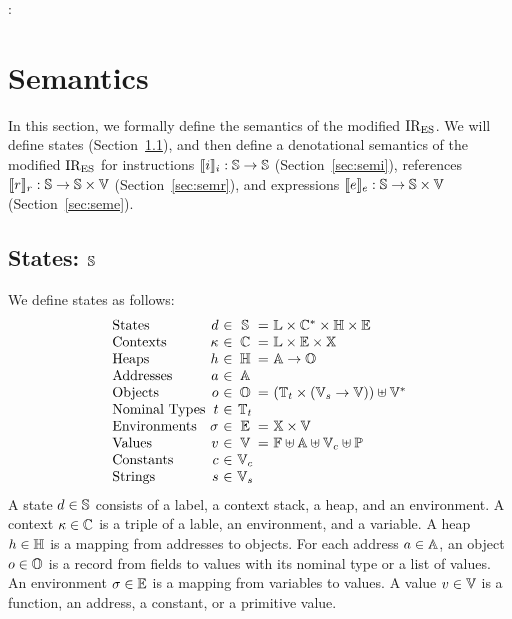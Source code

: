 : \section{Semantics}\label{sec:semantics}
In this section, we formally define the semantics of the modified ${\text{IR}_\text{ES}}$.  We
will define states (Section~\ref{sec:state}), and then define a denotational
semantics of the modified ${\text{IR}_\text{ES}}$ for instructions $\llbracket{i}\rrbracket_i: \mathbb{S}
\rightarrow \mathbb{S}$ (Section~\ref{sec:semi}), references $\llbracket{r}\rrbracket_r: \mathbb{S}
\rightarrow \mathbb{S} \times \mathbb{V}$ (Section~\ref{sec:semr}), and expressions
$\llbracket{e}\rrbracket_e: \mathbb{S} \rightarrow \mathbb{S} \times \mathbb{V}$ (Section~\ref{sec:seme}).


\subsection{States: $\mathbb{S}$}\label{sec:state}
We define states as follows:
\[
  \vspace*{-1em}
  \begin{array}{l@{~}r@{~}c@{~}c@{~}r@{~}l}
    \text{States}
    &\elem&\in&\dom&=& \labset \times \ctxtset^* \times \heapset \times \envset\\

    \text{Contexts}
    &\ctxt&\in&\ctxtset&=& \labset \times \envset \times \varset\\

    \text{Heaps}
    &\heap&\in&\heapset&=& \addrset \rightarrow \objset\\

    \text{Addresses}
    &\addr&\in&\addrset\\

    \text{Objects}
    &\obj&\in&\objset&=& (\tnameset \times (\strset \rightarrow \valset)) \uplus
    \valset^*\\

    \text{Nominal Types}
    &\tname&\in&\tnameset\\

    \text{Environments}
    &\env&\in&\envset&=& \varset \times \valset\\

    \text{Values}
    &\val&\in&\valset&=& \funcset \uplus \addrset \uplus \constset \uplus \primset\\

    \text{Constants}
    &\const&\in&\constset\\

    \text{Strings}
    &\str&\in&\strset\\
  \end{array}
  \vspace*{1em}
\]
A state $d \in \mathbb{S}$ consists of a label, a context stack, a heap, and an
environment.  A context $\kappa \in \mathbb{C}$ is a triple of a lable, an
environment, and a variable.  A heap $h \in \mathbb{H}$ is a mapping from
addresses to objects.  For each address $a \in \mathbb{A}$, an object $o
\in \mathbb{O}$ is a record from fields to values with its nominal type or a list
of values.  An environment $\sigma \in \mathbb{E}$ is a mapping from variables to
values.  A value $v \in \mathbb{V}$ is a function, an address, a constant, or a
primitive value.

